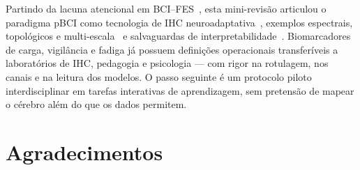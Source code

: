 \documentclass[12pt]{article}
\begin{document}
Partindo da lacuna atencional em BCI--FES~\cite{Faria2026}, esta mini-revis\~{a}o articulou o paradigma pBCI como tecnologia de IHC neuroadaptativa~\cite{Arico2017,Zander2016}, exemplos espectrais, topol\'{o}gicos e multi-escala~\cite{Arif2023,Rutkowski2023,Ko2021} e salvaguardas de interpretabilidade~\cite{Haufe2014,Lotte2018}. Biomarcadores de carga, vigil\^{a}ncia e fadiga j\'{a} possuem defini\c{c}\~{o}es operacionais transfer\'{i}veis a laborat\'{o}rios de IHC, pedagogia e psicologia --- com rigor na rotulagem, nos canais e na leitura dos modelos. O passo seguinte \'{e} um protocolo piloto interdisciplinar em tarefas interativas de aprendizagem, sem pretens\~{a}o de mapear o c\'{e}rebro al\'{e}m do que os dados permitem.

\section*{Agradecimentos}



\end{document}
